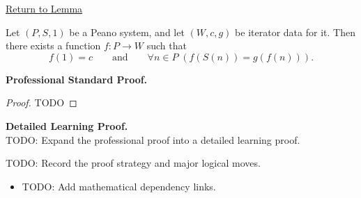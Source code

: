 \newpage
{}
\label{prf:existence-of-iterator-function}

\begin{remark*}[Return]
\hyperref[lem:existence-of-iterator-function]{Return to Lemma}
\end{remark*}

\begin{theorem*}
Let $(P,S,1)$ be a Peano system, and let $(W,c,g)$ be iterator data for it.
Then there exists a function $f:P\to W$ such that
\[
f(1)=c
\qquad\text{and}\qquad
\forall n\in P\;(f(S(n))=g(f(n))).
\]
\end{theorem*}

\textbf{Professional Standard Proof.}~\\
\begin{proof}
TODO
\end{proof}

\textbf{Detailed Learning Proof.}~\\
TODO: Expand the professional proof into a detailed learning proof.

\begin{remark*}
TODO: Record the proof strategy and major logical moves.
\end{remark*}

\begin{dependencies}
\begin{itemize}
  \item TODO: Add mathematical dependency links.
\end{itemize}
\end{dependencies}
